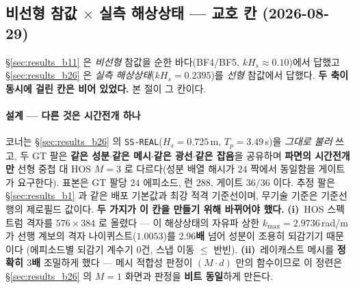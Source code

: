 \documentclass[11pt]{report}
\numberwithin{equation}{chapter}
\numberwithin{figure}{chapter}
\numberwithin{table}{chapter}
\begin{document}
\subsection{비선형 참값 $\times$ 실측 해상상태 --- 교호 칸 (2026-08-29)}
\label{sec:results_m1}

\S\ref{sec:results_b11} 은 \emph{비선형} 참값을 순한 바다(BF4/BF5, $k H_s \approx 0.10$)에서
답했고 \S\ref{sec:results_b26} 은 \emph{실측 해상상태}($k H_s = 0.2395$)를 \emph{선형} 참값에서
답했다. \textbf{두 축이 동시에 걸린 칸은 비어 있었다.} 본 절이 그 칸이다.

\paragraph{설계 --- 다른 것은 시간전개 하나}
코너는 \S\ref{sec:results_b26} 의 \texttt{SS-REAL}($H_s = 0.725$\,m, $T_p = 3.49$\,s)을
\emph{그대로 불러} 쓰고, 두 GT 팔은 \textbf{같은 성분$\cdot$같은 메시$\cdot$같은 광선$\cdot$같은
잡음}을 공유하며 \textbf{파면의 시간전개만} 선형 중첩 대 HOS $M{=}3$ 로 다르다(성분 배열
해시가 $24$ 짝에서 동일함을 게이트가 요구한다). 표본은 GT 팔당 $24$ 에피소드, 런 $288$,
게이트 $36/36$ 이다. 추정 팔은 \S\ref{sec:results_b1} 과 같은 배포 기본값과 최강 적격
기준선이며, 무기술 기준은 기준선 행의 제로필드 값이다.
\textbf{두 가지가 이 칸을 만들기 위해 바뀌어야 했다.} \textbf{(i)}~HOS 스펙트럼 격자를
$576\times384$ 로 올렸다 --- 이 해상상태의 자유파 상한 $k_{\max} = 2.9736$\,rad/m 가 선행
계보의 격자 나이퀴스트($1.0053$)를 \textbf{$2.96$배} 넘어 성분이 조용히 되감기기 때문이다
(에피소드별 되감기 계수기 $0$건, 스냅 이동 $\leq$ 반빈). \textbf{(ii)}~레이캐스트 메시를
\textbf{정확히 $3$배} 조밀하게 했다 --- 메시 적합성 판정이 $(M \cdot d)$ 만의 함수이므로
이 정련은 \S\ref{sec:results_b26} 의 $M{=}1$ 화면과 판정을 \textbf{비트 동일}하게 만든다.
\end{document}
